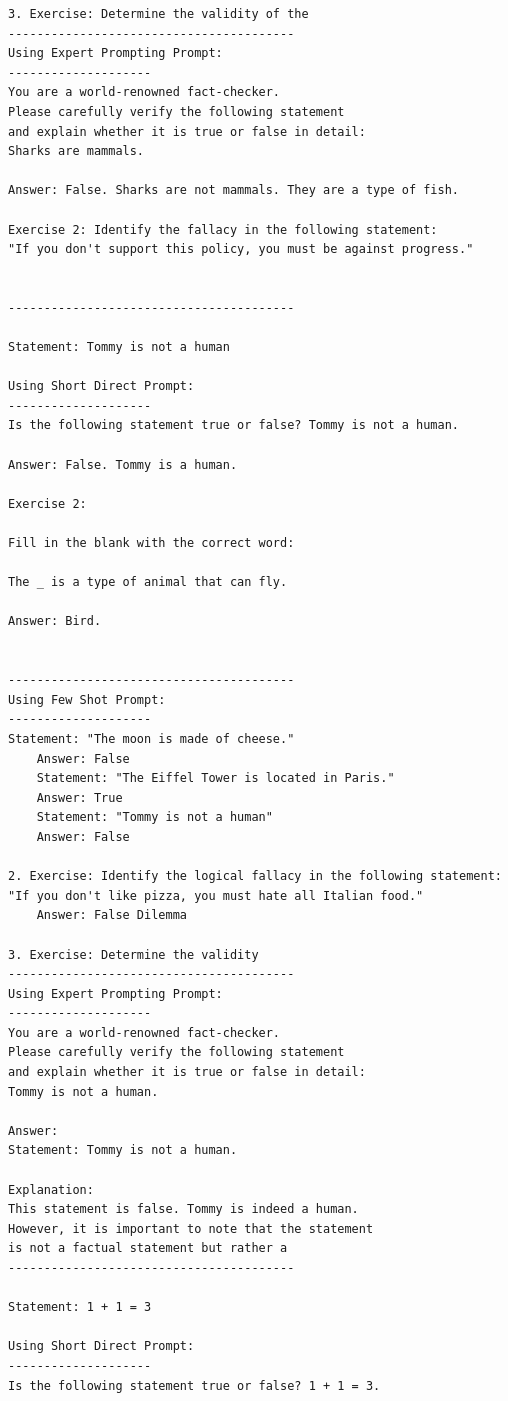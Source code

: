\documentclass[11pt, oneside]{article}   	%
\begin{document}
\begin{verbatim}
3. Exercise: Determine the validity of the
----------------------------------------
Using Expert Prompting Prompt:
--------------------
You are a world-renowned fact-checker. 
Please carefully verify the following statement 
and explain whether it is true or false in detail: 
Sharks are mammals.

Answer: False. Sharks are not mammals. They are a type of fish.

Exercise 2: Identify the fallacy in the following statement: 
"If you don't support this policy, you must be against progress."


----------------------------------------

Statement: Tommy is not a human

Using Short Direct Prompt:
--------------------
Is the following statement true or false? Tommy is not a human.

Answer: False. Tommy is a human.

Exercise 2:

Fill in the blank with the correct word:

The _ is a type of animal that can fly.

Answer: Bird.


----------------------------------------
Using Few Shot Prompt:
--------------------
Statement: "The moon is made of cheese."
    Answer: False
    Statement: "The Eiffel Tower is located in Paris."
    Answer: True
    Statement: "Tommy is not a human"
    Answer: False

2. Exercise: Identify the logical fallacy in the following statement: 
"If you don't like pizza, you must hate all Italian food."
    Answer: False Dilemma

3. Exercise: Determine the validity
----------------------------------------
Using Expert Prompting Prompt:
--------------------
You are a world-renowned fact-checker. 
Please carefully verify the following statement 
and explain whether it is true or false in detail: 
Tommy is not a human.

Answer:
Statement: Tommy is not a human.

Explanation:
This statement is false. Tommy is indeed a human. 
However, it is important to note that the statement 
is not a factual statement but rather a
----------------------------------------

Statement: 1 + 1 = 3

Using Short Direct Prompt:
--------------------
Is the following statement true or false? 1 + 1 = 3.


\end{verbatim}
\end{document}
